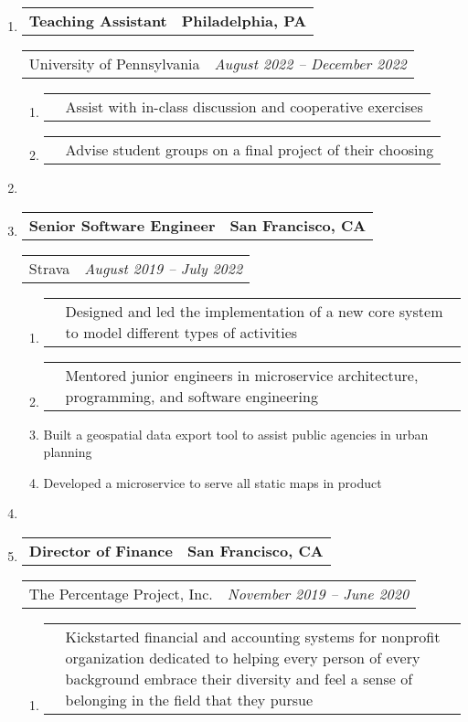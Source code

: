 \documentclass[letterpaper]{article}
\makeatletter
\newcommand*{\tabulardef}[3]{\begin{tabular}[t]{@{}lp{\dimexpr\linewidth-#1}@{}}
    #2&#3
\end{tabular}}
\newcommand{\headerrow}[2]
{\begin{tabular*}{\linewidth}{l@{\extracolsep{\fill}}r}
	#1 &
	#2 \\
\end{tabular*}}
\makeatother
\begin{document}
\begin{enumerate}[label=]
	\parskip=-0.25em

	\item
		\headerrow
			{\textbf{Teaching Assistant}}
            {\textbf{Philadelphia, PA}}
	\headerrow
        {University of Pennsylvania}
		{\emph{August 2022 -- December 2022}}
	\begin{enumerate}[label= *]
		\parskip=-0.1em
        \item\tabulardef{5cm}{}{Assist with in-class discussion and cooperative exercises}
        \item\tabulardef{5cm}{}{Advise student groups on a final project of their choosing}
	\end{enumerate}

    \item

	\item
		\headerrow
			{\textbf{Senior Software Engineer}}
			{\textbf{San Francisco, CA}}
	\headerrow
		{Strava}
		{\emph{August 2019 -- July 2022}}
	\begin{enumerate}[label= *]
	\parskip=-0.1em
        \item\tabulardef{5cm}{}{Designed and led the implementation of a new core system to model different types of activities}
        \item\tabulardef{5cm}{}{Mentored junior engineers in microservice architecture, programming, and software engineering}
        \item Built a geospatial data export tool to assist public agencies in urban planning 
        \item Developed a microservice to serve all static maps in product
	\end{enumerate}
	
    \item 

    \item
       \headerrow
           {\textbf{Director of Finance}}
           {\textbf{San Francisco, CA}}
       \headerrow
           {The Percentage Project, Inc.}
           {\emph{November 2019 -- June 2020}}
       \begin{enumerate}[label= *]
           \parskip=-0.1em
           \item\tabulardef{5cm}{}{Kickstarted financial and accounting systems for nonprofit organization dedicated to helping every person of every background embrace their diversity and feel a sense of belonging in the field that they pursue}
       \end{enumerate}


\end{enumerate}
\end{document}
